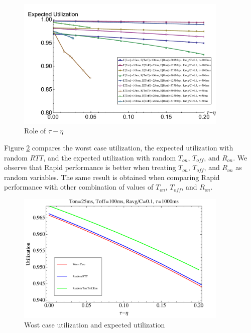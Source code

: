   \begin{figure}[h]
    \centering
    \includegraphics[width=0.9\textwidth]{img/taueta.pdf}
    \caption{Role of $\tau - \eta$}
    \label{taueta}
  \end{figure}

  Figure \ref{comparison} compares the worst case utilization, the expected 
  utilization with random $RTT$, and the expected utilization with random 
  $T_{on}$, $T_{off}$, and $R_{on}$. We observe that Rapid performance is 
  better when treating $T_{on}$, $T_{off}$, and $R_{on}$ as random variables.
  The same result is obtained when comparing Rapid performance with other 
  combination of values of $T_{on}$, $T_{off}$, and $R_{on}$.
  \begin{figure}[h]
    \centering
    \includegraphics[width=0.9\textwidth]{img/comparison.pdf}
    \caption{Wost case utilization and expected utilization}
    \label{comparison}
  \end{figure}

